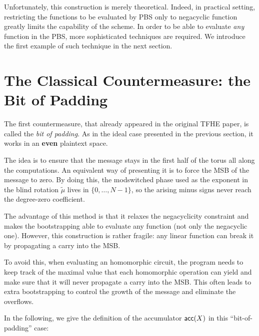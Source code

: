 Unfortunately, this construction is merely theoretical. Indeed, in practical setting, restricting the functions to be evaluated by \gls{PBS} only to negacyclic function greatly limits the capability of the scheme. In order to be able to evaluate \textit{any} function in the \gls{PBS}, more sophisticated techniques are required. We introduce the first example of such technique in the next section.


\section{The Classical Countermeasure: the Bit of Padding}
\label{sec:bit_of_padding}

The first countermeasure, that already appeared in the original \gls{TFHE} paper, is called the \textit{bit of padding}. As in the ideal case presented in the previous section, it works in an \textbf{even} plaintext space.

The idea is to ensure that the message stays in the first half of the torus all along the computations. An equivalent way of presenting it is to force the \gls{MSB} of the message to zero. By doing this, the modswitched phase used as the exponent in the blind rotation $\tilde{\mu}$ lives in $\{0, \dots, N - 1\}$, so the arising minus signs never reach the degree-zero coefficient.

The advantage of this method is that it relaxes the negacyclicity constraint and makes the bootstrapping able to evaluate any function (not only the negacyclic one). However, this construction is rather fragile: any linear function can break it by propagating a carry into the \gls{MSB}. 

To avoid this, when evaluating an homomorphic circuit, the program needs to keep track of the maximal value that each homomorphic operation can yield and make sure that it will never propagate a carry into the \gls{MSB}. This often leads to extra bootstrapping to control the growth of the message and eliminate the overflows. 


In the following, we give the definition of the accumulator $\textsf{acc}(X)$ in this ``bit-of-padding'' case:

